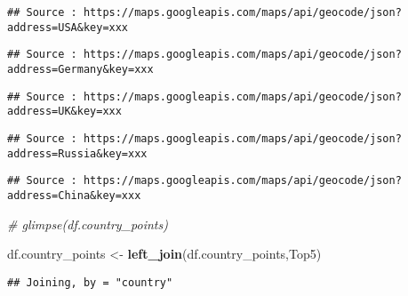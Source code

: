 \documentclass[]{article}
\newenvironment{Shaded}{\begin{snugshade}}{\end{snugshade}}
\newcommand{\CommentTok}[1]{\textcolor[rgb]{0.56,0.35,0.01}{\textit{#1}}}
\newcommand{\KeywordTok}[1]{\textcolor[rgb]{0.13,0.29,0.53}{\textbf{#1}}}
\newcommand{\NormalTok}[1]{#1}
\newcommand{\StringTok}[1]{\textcolor[rgb]{0.31,0.60,0.02}{#1}}
\begin{document}
\begin{verbatim}
## Source : https://maps.googleapis.com/maps/api/geocode/json?address=USA&key=xxx
\end{verbatim}

\begin{verbatim}
## Source : https://maps.googleapis.com/maps/api/geocode/json?address=Germany&key=xxx
\end{verbatim}

\begin{verbatim}
## Source : https://maps.googleapis.com/maps/api/geocode/json?address=UK&key=xxx
\end{verbatim}

\begin{verbatim}
## Source : https://maps.googleapis.com/maps/api/geocode/json?address=Russia&key=xxx
\end{verbatim}

\begin{verbatim}
## Source : https://maps.googleapis.com/maps/api/geocode/json?address=China&key=xxx
\end{verbatim}

\begin{Shaded}
\begin{Highlighting}[]
\CommentTok{# glimpse(df.country_points)}

\NormalTok{df.country_points <-}\StringTok{ }\KeywordTok{left_join}\NormalTok{(df.country_points,Top5)}
\end{Highlighting}
\end{Shaded}

\begin{verbatim}
## Joining, by = "country"
\end{verbatim}
\end{document}
